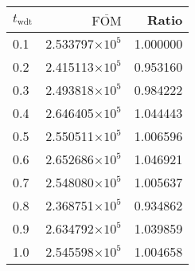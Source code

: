 \begin{tabular}{lrr}
\toprule
$t_{\mathrm{wdt}}$ & $\overline{\mathrm{FOM}}$ &    Ratio \\
\midrule
               0.1 &   2.533797$\times 10^{5}$ & 1.000000 \\
               0.2 &   2.415113$\times 10^{5}$ & 0.953160 \\
               0.3 &   2.493818$\times 10^{5}$ & 0.984222 \\
               0.4 &   2.646405$\times 10^{5}$ & 1.044443 \\
               0.5 &   2.550511$\times 10^{5}$ & 1.006596 \\
               0.6 &   2.652686$\times 10^{5}$ & 1.046921 \\
               0.7 &   2.548080$\times 10^{5}$ & 1.005637 \\
               0.8 &   2.368751$\times 10^{5}$ & 0.934862 \\
               0.9 &   2.634792$\times 10^{5}$ & 1.039859 \\
               1.0 &   2.545598$\times 10^{5}$ & 1.004658 \\
\bottomrule
\end{tabular}

